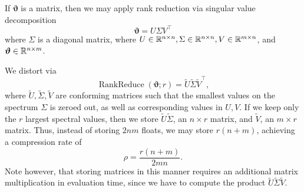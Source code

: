 \documentclass[11pt]{article}
\newcommand{\rankreduce}{\operatorname{RankReduce}}
\newcommand{\bvartheta}{{\bm{\vartheta}}}
\begin{document}
 If $\bvartheta$ is a matrix, then we may apply
rank
reduction via singular value decomposition \[
\bvartheta = U\Sigma V^\top
\]
where $\Sigma$ is a diagonal matrix, where $U \in \mathbb{R}^{n\times n}, \Sigma\in \mathbb{R}^
{n\times n}, V\in \mathbb{R}^{m\times n}$, and $\bvartheta \in \R^{n\times m}$.

We distort via \[
\rankreduce(\bvartheta; r) = \tilde U \tilde \Sigma \tilde V^\top,
\]
where $\tilde U, \tilde \Sigma, \tilde V$ are conforming matrices such that the
smallest values on the spectrum $\Sigma$ is zeroed out, as well as corresponding
values in $U,V$. If we keep only the $r$ largest spectral values, then we store
$\tilde U \tilde \Sigma$, an $n\times r$ matrix, and $\tilde V$, an $m\times r$
matrix. Thus, instead of storing $2nm$ floats, we may store $r(n+m)$, achieving
a compression rate of \[
\rho = \frac{r(n+m)}{2mn}.
\]
Note however, that storing matrices in this manner requires an additional
matrix multiplication in evaluation time, since we have to compute the product
$\tilde U \tilde \Sigma \tilde V$.







\end{document}
